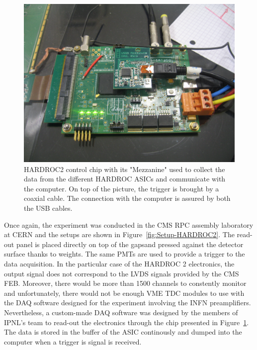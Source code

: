 	\begin{figure}[H]
	    \centering
		\includegraphics[width = 0.7\linewidth]{fig/chapt6/HARDROC_chip.JPG}
		\caption{\label{fig:HARDROC2-chip} HARDROC2 control chip with its "Mezzanine" used to collect the data from the different HARDROC ASICs and communicate with the computer. On top of the picture, the trigger is brought by a coaxial cable. The connection with the computer is assured by both the USB cables.}
    \end{figure}
	
	Once again, the experiment was conducted in the CMS RPC assembly laboratory at CERN and the setups are shown in Figure~\ref{fig:Setup-HARDROC2}. The read-out panel is placed directly on top of the gapsand pressed against the detector surface thanks to weights. The same PMTs are used to provide a trigger to the data acquisition. In the particular case of the HARDROC 2 electronics, the output signal does not correspond to the LVDS signals provided by the CMS FEB. Moreover, there would be more than 1500 channels to constently monitor and unfortunately, there would not be enough VME TDC modules to use with the DAQ software designed for the experiment involving the INFN preamplifiers. Nevertheless, a custom-made DAQ software was designed by the members of IPNL's team to read-out the electronics through the chip presented in Figure~\ref{fig:HARDROC2-chip}. The data is stored in the buffer of the ASIC continously and dumped into the computer when a trigger is signal is received.
	
